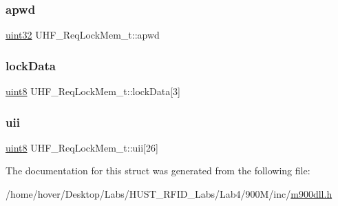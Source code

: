 \subsubsection{\texorpdfstring{apwd}{apwd}}
{\footnotesize\ttfamily \mbox{\hyperlink{m900dll_8h_a4b435a49c74bb91f284f075e63416cb6}{uint32}} U\+H\+F\+\_\+\+Req\+Lock\+Mem\+\_\+t\+::apwd}

\mbox{\label{struct_u_h_f___req_lock_mem__t_a1dc5ffb774a7af9d377c1d7252fa0943}} 
\subsubsection{\texorpdfstring{lockData}{lockData}}
{\footnotesize\ttfamily \mbox{\hyperlink{m900dll_8h_adde6aaee8457bee49c2a92621fe22b79}{uint8}} U\+H\+F\+\_\+\+Req\+Lock\+Mem\+\_\+t\+::lock\+Data\mbox{[}3\mbox{]}}

\mbox{\label{struct_u_h_f___req_lock_mem__t_aad7c2df7bf085de7cc90e2b4d36a2f48}} 
\subsubsection{\texorpdfstring{uii}{uii}}
{\footnotesize\ttfamily \mbox{\hyperlink{m900dll_8h_adde6aaee8457bee49c2a92621fe22b79}{uint8}} U\+H\+F\+\_\+\+Req\+Lock\+Mem\+\_\+t\+::uii\mbox{[}26\mbox{]}}



The documentation for this struct was generated from the following file\+:\begin{DoxyCompactItemize}
\item 
/home/hover/\+Desktop/\+Labs/\+H\+U\+S\+T\+\_\+\+R\+F\+I\+D\+\_\+\+Labs/\+Lab4/900\+M/inc/\mbox{\hyperlink{m900dll_8h}{m900dll.\+h}}\end{DoxyCompactItemize}
